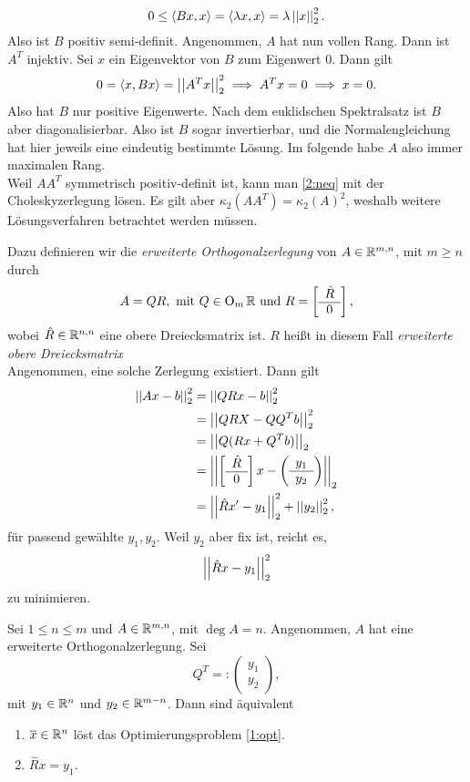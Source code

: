 \[
0\leq \langle Bx,x\rangle  = \langle \lambda x,x\rangle = \lambda \left|\left|x\right|\right|_2^2.
\]
Also ist $B$ positiv semi-definit. Angenommen, $A$ hat nun vollen Rang. Dann ist $A^T$ injektiv. Sei $x$ ein Eigenvektor von $B$ zum Eigenwert $0$. Dann gilt
\[
0 = \langle x,Bx\rangle = \left|\left|A^Tx\right|\right|_2^2\implies A^Tx=0\implies x=0.
\]
Also hat $B$ nur positive Eigenwerte. Nach dem euklidschen Spektralsatz \cite[20.25]{schroer} ist $B$ aber diagonalisierbar. Also ist $B$ sogar invertierbar,
\color{black} und die Normalengleichung hat hier jeweils eine eindeutig bestimmte Lösung. Im folgende habe $A$ also immer maximalen Rang.\\
Weil $AA^T$ symmetrisch positiv-definit ist, kann man \eqref{2:neq} mit der Choleskyzerlegung lösen. Es gilt aber $\kappa_2(AA^T)=\kappa_2(A)^2$, weshalb weitere Lösungsverfahren betrachtet werden müssen.\par
Dazu definieren wir die \emph{erweiterte Orthogonalzerlegung}  von $A\in \mathbb{R}^{m,n}$, mit $m\geq n$ durch
\[
A = QR,~\text{mit }Q\in \operatorname{O}_m{\mathbb{R}}~\text{und}~R=\left[\begin{array}{c}\hat{R}\\\hline 0\end{array}\right],
\]
wobei $\hat{R}\in \mathbb{R}^{n,n}$ eine obere Dreiecksmatrix ist. $R$ heißt in diesem Fall \emph{erweiterte obere Dreiecksmatrix} \\
Angenommen, eine solche Zerlegung existiert. Dann gilt
\begin{align*}
  \left|\left|Ax-b\right|\right|_2^2&= \left|\left|QRx-b\right|\right|_2^2\\
  &=\left|\left|QRX-QQ^Tb\right|\right|_2^2\\
  &= \left|\left|Q(Rx+Q^Tb)\right|\right|_2\\
  &= \left|\left|\left[\begin{array}{c}\hat{R}\\\hline0\end{array}\right]x-\left(\begin{array}{c}y_1\\\hline y_2\end{array}\right)\right|\right|_2\\
  &= \left|\left|\hat{R}x'-y_1\right|\right|_2^2+\left|\left|y_2\right|\right|_2^2,
\end{align*}
für passend gewählte $y_1,y_2$. Weil $y_2$ aber fix ist, reicht es,
\[
\left|\left|\hat{R}x-y_1\right|\right|_2^2
\]
zu minimieren.
\begin{thm}
  Sei $1\leq n \leq m$ und $A\in \mathbb{R}^{m,n}$, mit $\deg A = n$. Angenommen, $A$ hat eine erweiterte Orthogonalzerlegung. Sei
  \[
  Q^T=:\left( \begin{array}{c} y_1\\\hline y_2\end{array}\right),
  \]
  mit $y_1\in \mathbb{R}^{n}$ und $y_2\in \mathbb{R}^{m-n}$. Dann sind äquivalent
  \begin{enumerate}
    \item $\overline{x}\in \mathbb{R}^n$ löst das Optimierungsproblem \eqref{1:opt}.
    \item $\hat{R}x=y_1$.
  \end{enumerate}
\end{thm}
